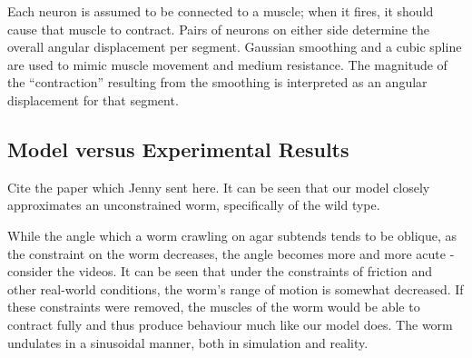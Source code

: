 \documentclass[
    11pt,
]{article}
\begin{document}
Each neuron is assumed to be connected to a muscle; when it fires, it should cause that muscle to contract.
Pairs of neurons on either side determine the overall angular displacement per segment.
Gaussian smoothing and a cubic spline are used to mimic muscle movement and medium resistance.
The magnitude of the “contraction” resulting from the smoothing is interpreted as an angular displacement for that segment.



\subsection{Model versus Experimental Results}

Cite the paper which Jenny sent here.  It can be seen that our model closely approximates an unconstrained worm, specifically of the wild type.

While the angle which a worm crawling on agar subtends tends to be oblique, as the constraint on the worm decreases, the angle becomes more and more acute - consider the videos.  It can be seen that under the constraints of friction and other real-world conditions, the worm's range of motion is somewhat decreased.  If these constraints were removed, the muscles of the worm would be able to contract fully and thus produce behaviour much like our model does.  The worm undulates in a sinusoidal manner, both in simulation and reality.
\end{document}
